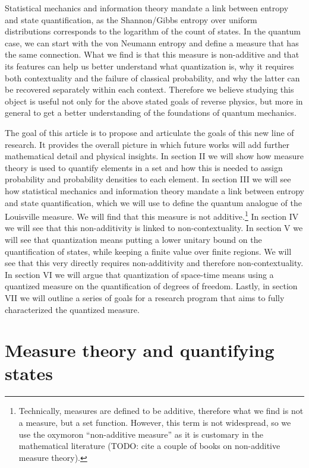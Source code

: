 \documentclass[10pt,twocolumn, nofootinbib]{revtex4-2}
\begin{document}
Statistical mechanics and information theory mandate a link between entropy and state quantification, as the Shannon/Gibbs entropy over uniform distributions corresponds to the logarithm of the count of states. In the quantum case, we can start with the von Neumann entropy and define a measure that has the same connection. What we find is that this measure is non-additive and that its features can help us better understand what quantization is, why it requires both contextuality and the failure of classical probability, and why the latter can be recovered separately within each context. Therefore we believe studying this object is useful not only for the above stated goals of reverse physics, but more in general to get a better understanding of the foundations of quantum mechanics.

The goal of this article is to propose and articulate the goals of this new line of research. It provides the overall picture in which future works will add further mathematical detail and physical insights. In section II we will show how measure theory is used to quantify elements in a set and how this is needed to assign probability and probability densities to each element. In section III we will see how statistical mechanics and information theory mandate a link between entropy and state quantification, which we will use to define the quantum analogue of the Louisville measure. We will find that this measure is not additive.\footnote{Technically, measures are defined to be additive, therefore what we find is not a measure, but a set function. However, this term is not widespread, so we use the oxymoron ``non-additive measure'' as it is customary in the mathematical literature (TODO: cite a couple of books on non-additive measure theory).} In section IV we will see that this non-additivity is linked to non-contextuality. In section V we will see that quantization means putting a lower unitary bound on the quantification of states, while keeping a finite value over finite regions. We will see that this very directly requires non-additivity and therefore non-contextuality. In section VI we will argue that quantization of space-time means using a quantized measure on the quantification of degrees of freedom. Lastly, in section VII we will outline a series of goals for a research program that aims to fully characterized the quantized measure.

\section{Measure theory and quantifying states}
\end{document}
